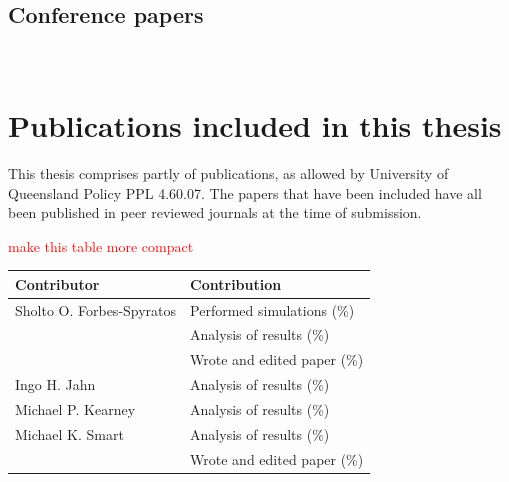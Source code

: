 \subsection*{Conference papers}

\noindent{}\\


\section*{Publications included in this thesis}

This thesis comprises partly of publications, as allowed by University of Queensland Policy PPL 4.60.07. The papers that have been included have all been published in peer reviewed journals at the time of submission. 


\textcolor{red}{make this table more compact}


\vspace{\baselineskip}

\begin{center}
  \begin{tabular}{ll}
    \toprule
    Contributor   & Contribution \\
    \midrule
    Sholto O. Forbes-Spyratos             
                                  & Performed simulations (\%)\\
                                  & Analysis of results (\%)\\
                                  & Wrote and edited paper (\%)\\
    \midrule
    Ingo H. Jahn            
                                  & Analysis of results (\%)\\
                                  
        \midrule
        Michael P. Kearney            
								      & Analysis of results (\%)\\                          

    \midrule
    Michael K. Smart              
                                  & Analysis of results (\%)\\
                                  & Wrote and edited paper (\%)\\
    \bottomrule
  \end{tabular}
\end{center}



